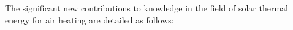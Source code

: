 %

The significant new contributions to knowledge in the field of solar thermal energy for air heating are detailed as follows:

